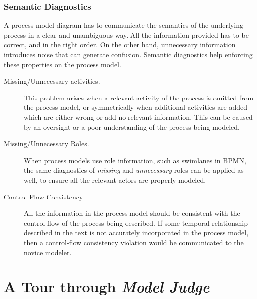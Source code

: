 \subsubsection{Semantic Diagnostics}

A process model diagram has to communicate the semantics of the underlying
process in a clear and unambiguous way. 
All the information provided has to be
correct, and in the right order. On the other hand, unnecessary information
introduces noise that can generate confusion. Semantic diagnostics help enforcing these properties on the process model.

\begin{description}
\item[Missing/Unnecessary activities.]{This problem arises when a relevant activity of the
    process is omitted from the process model, or symmetrically when additional activities are added which are either wrong or add no relevant
    information. This can be caused by an
    oversight or a poor understanding of the process being modeled.}
  

\item[Missing/Unnecessary Roles.]{When process models use role information,
    such as swimlanes in BPMN, the same diagnostics of \emph{missing} 
    and \emph{unnecessary} roles can be applied as well, to ensure
    all the relevant actors are properly modeled.}
  
\item[Control-Flow Consistency.]{All the information in the process model
    should be consistent with the control flow of the process being described. 
    If some temporal relationship described in the text is not accurately incorporated in the process model, then a control-flow consistency violation would be communicated to the novice modeler.}  
\end{description}

\section{A Tour through \emph{Model Judge}}
\label{sec:modeljudge_tour}

